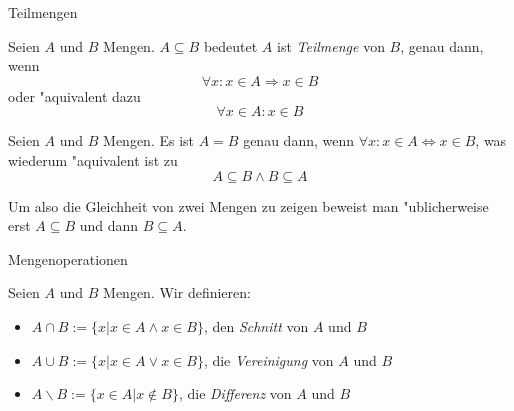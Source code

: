 \documentclass{beamer}
\begin{document}
\begin{frame}{Teilmengen}
  \begin{definition}[Teilmenge]
    Seien $A$ und $B$ Mengen. $A\subseteq B$ bedeutet $A$ ist \textit{Teilmenge} von $B$, genau dann, wenn 
    \[\forall x:x\in A\Rightarrow x\in B\] oder "aquivalent dazu \[\forall x\in A:x\in B\]
  \end{definition}
  
  \begin{lemma}
    Seien $A$ und $B$ Mengen. Es ist $A=B$ genau dann, wenn $\forall x:x\in A\Leftrightarrow x\in B$, was wiederum "aquivalent ist zu
    \[A\subseteq B\wedge B\subseteq A\]  
  \end{lemma}
  Um also die Gleichheit von zwei Mengen zu zeigen beweist man "ublicherweise erst $A\subseteq B$ und dann $B\subseteq A$.
\end{frame}

\begin{frame}{Mengenoperationen}
  \begin{definition}[Mengenoperationen]
    Seien $A$ und $B$ Mengen. Wir definieren:
    \begin{itemize}
      \item $A\cap B:=\{x|x\in A\wedge x\in B\}$, den \textit{Schnitt} von $A$ und $B$
      \item $A\cup B:=\{x|x\in A\vee x\in B\}$, die \textit{Vereinigung} von $A$ und $B$
      \item $A\backslash B:=\{x\in A|x\notin B\}$, die \textit{Differenz} von $A$ und $B$
    \end{itemize}
  \end{definition}
\end{frame}
\end{document}
